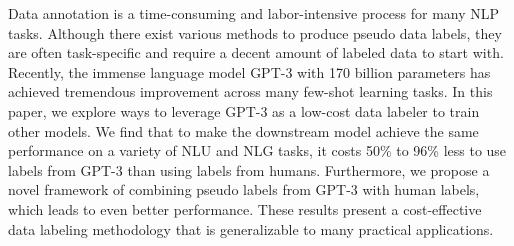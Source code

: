Data annotation is a time-consuming and labor-intensive process for many NLP tasks. Although there exist various methods to produce pseudo data labels, they are often task-specific and require a decent amount of labeled data to start with. Recently, the immense language model GPT-3 with 170 billion parameters has achieved tremendous improvement across many few-shot learning tasks. In this paper, we explore ways to leverage GPT-3 as a low-cost data labeler to train other models. We find that to make the downstream model achieve the same performance on a variety of NLU and NLG tasks, it costs 50\% to 96\% less to use labels from GPT-3 than using labels from humans. Furthermore, we propose a novel framework of combining pseudo labels from GPT-3 with human labels, which leads to even better performance. These results present a cost-effective data labeling methodology that is generalizable to many practical applications.
